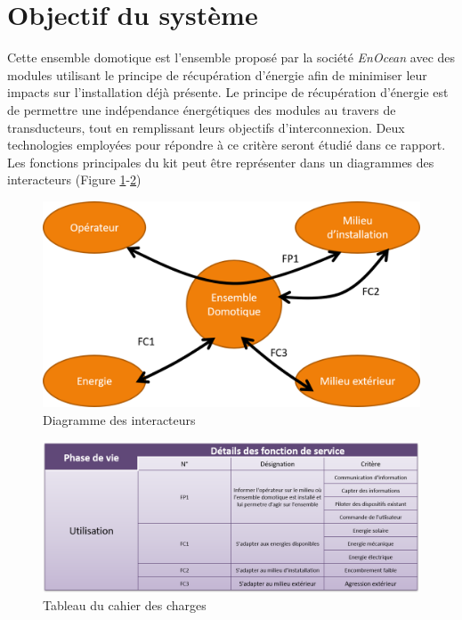 \documentclass{rapportENS}
\begin{document}
 \section{Objectif du système}
 Cette ensemble domotique est l'ensemble proposé par la société \textit{EnOcean} avec des modules utilisant le principe de récupération d'énergie afin de minimiser leur impacts sur l'installation déjà présente. Le principe de récupération d'énergie est de permettre une indépendance énergétiques des modules au travers de transducteurs, tout en remplissant leurs objectifs d'interconnexion. Deux technologies employées pour répondre à ce critère seront étudié dans ce rapport.  Les fonctions principales du kit peut être représenter dans un diagrammes des interacteurs (Figure \ref{fig:Inter-acteurs}-\ref{tableau_cdcf})
 \begin{figure}[h!]
     \centering
     \includegraphics[width=0.9\linewidth]{Graphe_cdcdf.png}
     \caption{Diagramme des interacteurs}
     \label{fig:Inter-acteurs}
     \end{figure}
     \begin{figure}
         \centering
            \includegraphics[width=\linewidth]{tableau_cdcf.png}
     \caption{Tableau du cahier des charges}
     \label{tableau_cdcf}
 \end{figure}


 
\end{document}

